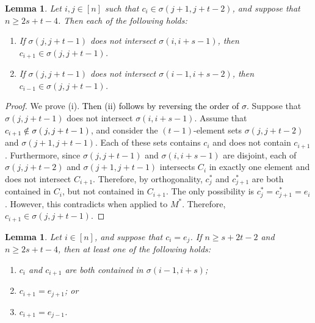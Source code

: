\documentclass[11pt]{amsart}
\newtheorem{lemma}[theorem]{Lemma}
\newcommand{\bloo}{\textcolor{black}}
\begin{document}
\begin{lemma}
\label{consec_nearby}
Let $i, j\in [n]$ such that $c_i\in \sigma(j+1, j+t-2)$, and suppose that $n\geq 2s+t-4$. Then each of the following holds:
\begin{enumerate}[{\rm (i)}]
\item If $\sigma(j, j+t-1)$ does not intersect $\sigma(i, i+s-1)$, then $c_{i+1}\in \sigma(j, j+t-1)$.

\item If $\sigma(j, j+t-1)$ does not intersect $\sigma(i-1, i+s-2)$, then $\left.c_{i-1}\in \sigma(j, j+t-1)\right.$.
\end{enumerate}
\end{lemma}

\begin{proof}
We prove (i). \bloo{Then (ii) follows by reversing the order of $\sigma$}. Suppose that $\sigma(j, j+t-1)$ does not intersect $\sigma(i, i+s-1)$. Assume that \bloo{$c_{i+1}\notin \sigma(j, j+t-1)$}, and consider the $(t-1)$-element sets $\sigma(j, j+t-2)$ and $\sigma(j+1, j+t-1)$. Each of these sets contains $c_i$ and does not contain $c_{i+1}$. Furthermore, since $\sigma(j, j+t-1)$ and $\sigma(i, i+s-1)$ are disjoint, each of $\sigma(j, j+t-2)$ and $\sigma(j+1, j+t-1)$ intersects $C_i$ in exactly one element and does not intersect $C_{i+1}$. Therefore, by orthogonality, $c^*_j$ and $c^*_{j+1}$ are both contained in $C_i$, but not contained in $C_{i+1}$. The only possibility is $c^*_j = c^*_{j+1} = e_i$. However, this contradicts  when applied to $M^*$. Therefore, $c_{i+1} \in \sigma(j, j+t-1)$.
\end{proof}

\begin{lemma}
\label{consecutive}
Let $i\in [n]$, and suppose that $c_i = e_j$. If $n \geq s+2t-2$ and $n \geq 2s+t-4$, then at least one of the following holds:
\begin{enumerate} [{\rm (i)}]
\item $c_i$ and $c_{i+1}$ are both contained in $\sigma(i-1,i+s)$;

\item $c_{i+1} = e_{j+1}$; or

\item $c_{i+1} = e_{j-1}$.
\end{enumerate}
\end{lemma}
\end{document}

